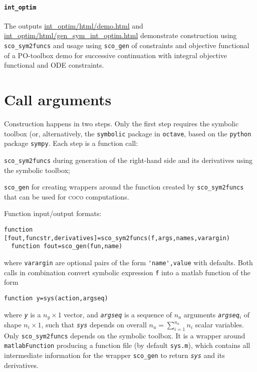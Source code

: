 \documentclass[11pt]{scrartcl}
\newcommand{\blist}[1]{\mbox{\lstinline!#1!}}
\newcommand{\genvar}[1]{\textit{\texttt{#1}}}
\begin{document}
\paragraph{\texttt{int\_optim}} The outputs
\url{int_optim/html/demo.html} and
\url{int_optim/html/gen_sym_int_optim.html} demonstrate construction
using \blist{sco_sym2funcs} and usage using \blist{sco_gen} of
constraints and objective functional of a PO-toolbox demo for
successive continuation with integral objective functional and ODE
constraints.



\section{Call arguments}
\label{sec:args}
Construction happens in two steps. Only the first step requires the symbolic toolbox  (or, alternatively, the \texttt{symbolic} package in \texttt{octave}, based on the \texttt{python} package \texttt{sympy}. Each step is a function call:
\begin{compactenum}
\item \blist{sco_sym2funcs} during generation of the right-hand side and its derivatives using the symbolic toolbox;
\item \blist{sco_gen} for creating wrappers around the function
  created by \blist{sco_sym2funcs} that can be used for \textsc{coco} computations.
\end{compactenum}

Function input/output formats:
\begin{lstlisting}[frame=none]
  function [fout,funcstr,derivatives]=sco_sym2funcs(f,args,names,varargin)
  function fout=sco_gen(fun,name)
\end{lstlisting}
where \blist{varargin} are optional pairs of the form
\blist{'name',value} with defaults. Both calls in combination convert symbolic expression
\blist{f} into a matlab function of the form
\begin{lstlisting}[frame=none,identifierstyle={\itshape}]
  function y=sys(action,argseq)
\end{lstlisting}
where \genvar{y} is a $n_y\times1$ vector, and \genvar{argseq} is a
sequence of $n_a$ arguments \genvar{argseq}$_i$ of shape $n_i\times1$,
such that \genvar{sys} depends on overall $n_u=\sum_{i=1}^{n_a}n_i$
scalar variables. Only \blist{sco_sym2funcs} depends on the symbolic
toolbox. It is a wrapper around \blist{matlabFunction} producing a
function file (by default \texttt{sys.m}), which contains all
intermediate information for the wrapper \blist{sco_gen} to return
\genvar{sys} and its derivatives.
\end{document}
